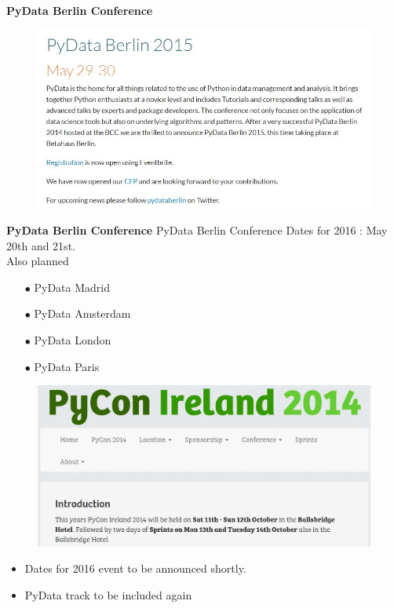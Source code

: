 \documentclass[MASTER.tex]{subfiles}
\begin{document}
	\begin{frame}
			\textbf{PyData Berlin Conference}
		\begin{figure}

\centering
\includegraphics[width=1.10\linewidth]{pydataberlinsiteinfo}

\end{figure}
	\end{frame}
	\begin{frame}
		\textbf{PyData Berlin Conference}
		\Large
\noindent PyData Berlin Conference Dates for 2016 : May 20th and 21st.\\ \bigskip
\noindent  Also planned
	{
		\large
	\begin{itemize}
		\item[$\bullet$] PyData Madrid
		\item[$\bullet$] PyData Amsterdam
				\item[$\bullet$] PyData London
				\item[$\bullet$] PyData Paris
	\end{itemize}
}

\end{frame}
\begin{frame}
	
\begin{figure}
\centering
\includegraphics[width=1.1\linewidth]{pyconsiteinfo}

\end{figure}
\begin{itemize}
\item Dates for 2016 event to be announced shortly. 
\item PyData track to be included again
\end{itemize}

\end{frame}
\end{document}

